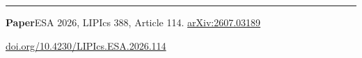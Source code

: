 {\color{PosterLine}\rule{\linewidth}{0.45\PosterUnit}\par}
{\PosterSmallFont\color{PosterMuted}
  \textbf{Paper}\quad ESA 2026, LIPIcs 388, Article 114.
  \hfill\href{\PosterFullURL}{arXiv:2607.03189}\par
  \href{\PosterPaperURL}{doi.org/10.4230/LIPIcs.ESA.2026.114}\par}
